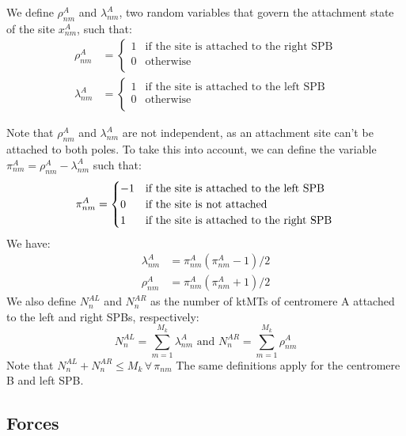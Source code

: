 \documentclass[a4paper,12pt]{article}
\renewcommand{\leq}{\leqslant}
\begin{document}
We define $\rho_{nm}^A$ and $\lambda_{nm}^A$, two random variables that govern
the attachment state of the site $x_{nm}^A$, such that:
\begin{align}
  \label{eq:rholambda}
  \rho_{nm}^A &= 
  \begin{cases}
    1 &\text{if the site is attached to the right SPB}\\
    0 &\text{otherwise}\\
  \end{cases}\\
  \lambda_{nm}^A &=
  \begin{cases}
    1 &\text{if the site is attached to the left SPB}\\
    0 &\text{otherwise}\\
  \end{cases}
\end{align}

Note that $\rho_{nm}^A$ and $\lambda_{nm}^A$ are not independent, as
an attachment site can't be attached to both poles. To take this into
account, we can define the variable $\pi_{nm}^A = \rho_{nm}^A -
\lambda_{nm}^A$ such that:
\begin{equation}
  \label{eq:pnm}
  \pi_{nm}^A = 
  \begin{cases}
    - 1 &\text{if the site is attached to the left SPB}\\
    0 &\text{if the site is not attached}\\
    1 &\text{if the site is attached to the right SPB}\\
  \end{cases}\\
\end{equation}
We have:
\begin{align}
  \lambda_{nm}^A &= \pi_{nm}^A\left(\pi_{nm}^A - 1\right)/2\\
  \rho_{nm}^A &= \pi_{nm}^A\left(\pi_{nm}^A + 1\right)/2
\end{align}
We also define $N_n^{AL}$ and $N_n^{AR}$ as the number of ktMTs of
centromere A attached to the left and right SPBs, respectively:
\begin{equation}
  \label{eq:NAL}
  N_n^{AL} = \sum_{m = 1}^{M_k}\lambda_{nm}^A \mbox{ and }%
  N_n^{AR} = \sum_{m = 1}^{M_k}\rho_{nm}^A 
\end{equation}
Note that $N_n^{AL} + N_n^{AR} \leq M_k\, \forall\, \pi_{nm} $
The same definitions apply for the centromere B and left SPB.

\subsection{Forces}
\end{document}
